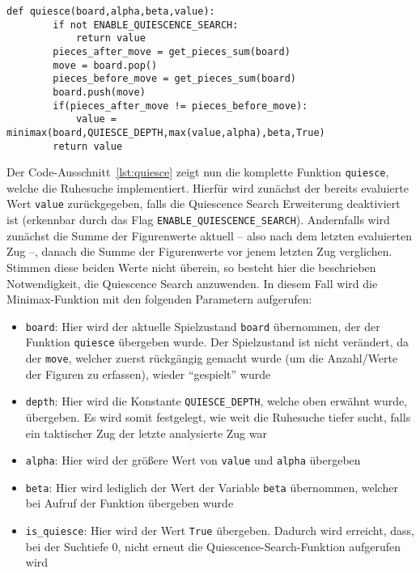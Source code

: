 \begin{lstlisting}[caption=Funktion für die Implementierung der Ruhesuche, label=lst:quiesce]
	def quiesce(board,alpha,beta,value):
    	if not ENABLE_QUIESCENCE_SEARCH:
			return value
		pieces_after_move = get_pieces_sum(board)
		move = board.pop()
		pieces_before_move = get_pieces_sum(board)
		board.push(move)
		if(pieces_after_move != pieces_before_move):
			value = minimax(board,QUIESCE_DEPTH,max(value,alpha),beta,True)
		return value
\end{lstlisting}

Der Code-Ausschnitt~\ref{lst:quiesce} zeigt nun die komplette Funktion \texttt{quiesce}, welche die Ruhesuche implementiert. Hierfür wird zunächst der bereits evaluierte Wert \texttt{value} zurückgegeben, falls die Quiescence Search Erweiterung deaktiviert ist (erkennbar durch das Flag \texttt{ENABLE\_QUIESCENCE\_SEARCH}). Andernfalls wird zunächst die Summe der Figurenwerte aktuell -- also nach dem letzten evaluierten Zug --, danach die Summe der Figurenwerte vor jenem letzten Zug verglichen. Stimmen diese beiden Werte nicht überein, so besteht hier die beschrieben Notwendigkeit, die Quiescence Search anzuwenden. In diesem Fall wird die Minimax-Funktion mit den folgenden Parametern aufgerufen:

\begin{itemize}
	\item \texttt{board}: Hier wird der aktuelle Spielzustand \texttt{board} übernommen, der der Funktion \texttt{quiesce} übergeben wurde. Der Spielzustand ist nicht verändert, da der \texttt{move}, welcher zuerst rückgängig gemacht wurde (um die Anzahl/Werte der Figuren zu erfassen), wieder "`gespielt"' wurde
	\item \texttt{depth}: Hier wird die Konstante \texttt{QUIESCE\_DEPTH}, welche oben erwähnt wurde, übergeben. Es wird somit festgelegt, wie weit die Ruhesuche tiefer sucht, falls ein taktischer Zug der letzte analysierte Zug war
	\item \texttt{alpha}: Hier wird der größere Wert von \texttt{value} und \texttt{alpha} übergeben
	\item \texttt{beta}: Hier wird lediglich der Wert der Variable \texttt{beta} übernommen, welcher bei Aufruf der Funktion übergeben wurde
	\item \texttt{is\_quiesce}: Hier wird der Wert \texttt{True} übergeben. Dadurch wird erreicht, dass, bei der Suchtiefe $0$, nicht erneut die Quiescence-Search-Funktion aufgerufen wird
\end{itemize}

